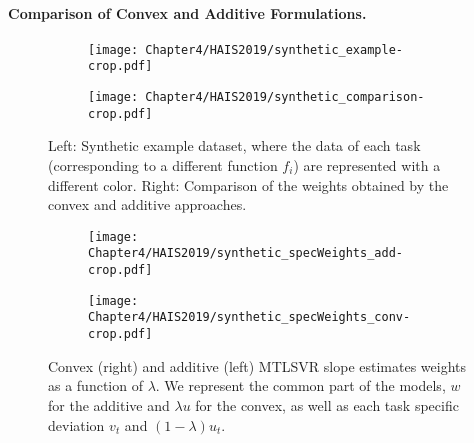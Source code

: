 \paragraph*{Comparison of Convex and Additive Formulations.\\}
\begin{figure}
    \centering
    \begin{subfigure}[b]{0.45\textwidth}
        \centering
        \texttt{[image: Chapter4/HAIS2019/synthetic\_example-crop.pdf]}
    \end{subfigure}
    \hfill
    \begin{subfigure}[b]{0.45\textwidth}
        \centering
        \texttt{[image: Chapter4/HAIS2019/synthetic\_comparison-crop.pdf]}
    \end{subfigure}
    \caption{Left: Synthetic example dataset, where the data of each task (corresponding to a different function $f_i$) are represented with a different color.
        Right: Comparison of the weights obtained by the {convex} and {additive} approaches.}
    \label{fig:lines_slopes}
\end{figure}

\begin{figure}
    \centering
    \begin{subfigure}[b]{0.45\textwidth}
        \centering
        \texttt{[image: Chapter4/HAIS2019/synthetic\_specWeights\_add-crop.pdf]}
    \end{subfigure}
    \hfill
    \begin{subfigure}[b]{0.45\textwidth}
        \centering
        \texttt{[image: Chapter4/HAIS2019/synthetic\_specWeights\_conv-crop.pdf]}
    \end{subfigure}
    \caption{{Convex} (right) and {additive} (left) MTLSVR slope estimates weights as a function of $\lambda$. We represent the common part of the models, $w$ for the {additive} and $\lambda u$ for the {convex}, as well as each task specific deviation $v_t$ and $(1 - \lambda) u_t$.}
    \label{fig:synthetic_specWeights}
\end{figure}


